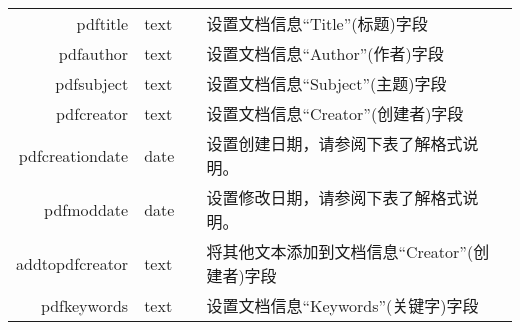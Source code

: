 \documentclass{article}
\begin{document}
\begin{longtable}{@{}>{\ttfamily}r>{\raggedright}p{}>{\itshape}lp{7cm}@{}}
  pdftitle            & text           &                           & 设置文档信息“Title”(标题)字段                                                                                                                                                                                                          \\
  pdfauthor           & text           &                           & 设置文档信息“Author”(作者)字段                                                                                                                                                                                                         \\
  pdfsubject          & text           &                           & 设置文档信息“Subject”(主题)字段                                                                                                                                                                                                        \\
  pdfcreator          & text           &                           & 设置文档信息“Creator”(创建者)字段                                                                                                                                                                                                       \\
  pdfcreationdate     & date           &                           & 设置创建日期，请参阅下表了解格式说明。                                                                                                                                                                                                          \\
  pdfmoddate          & date           &                           & 设置修改日期，请参阅下表了解格式说明。                                                                                                                                                                                                          \\
  addtopdfcreator     & text           &                           & 将其他文本添加到文档信息“Creator”(创建者)字段                                                                                                                                                                                                 \\
  pdfkeywords         & text           &                           & 设置文档信息“Keywords”(关键字)字段                                                                                                                                                                                                      \\

\end{longtable}
\end{document}

